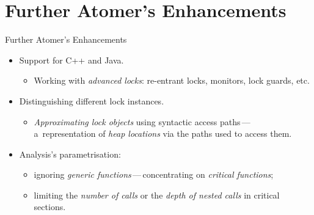 \documentclass[10pt, xcolor=pdflatex, hyperref={unicode}, aspectratio=169]{beamer}
\begin{document}
\section{Further Atomer's Enhancements}
\begin{frame}{Further Atomer's Enhancements}
    \begin{itemize}\setlength\itemsep{2.5em}
        \item Support for \alert{C++} and \alert{Java}.
            \medskip
            \begin{itemize}
                \item Working with \emph{advanced locks}: re-entrant locks, monitors, lock guards, etc.
            \end{itemize}

        \item Distinguishing \alert{different lock instances}.
            \medskip
            \begin{itemize}
                \item \emph{Approximating lock objects} using \alert{syntactic access paths}\,---\,a~representation of \emph{heap locations} via the paths used to access them.
            \end{itemize}

        \item Analysis's \alert{parametrisation}:
            \medskip
            \begin{itemize}\setlength\itemsep{.8em}
                \item \alert{ignoring} \emph{generic functions}\,---\,\alert{concentrating on} \emph{critical functions};
                    
                \item \alert{limiting} the \emph{number of calls} or the \emph{depth of nested calls} in \alert{critical sections}.
            \end{itemize}
    \end{itemize}
\end{frame}


\end{document}
